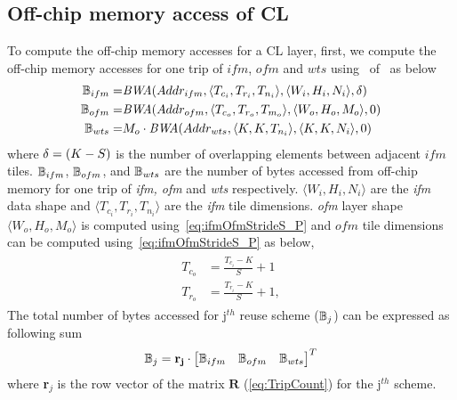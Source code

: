 \subsection{Off-chip memory access of CL}\label{sec:AccessCLData}
To compute the off-chip memory accesses for a CL layer, first, we compute the off-chip memory accesses for one trip of $ifm$, $ofm$ and $wts$ using~ of~ as below
\begin{align}\label{eq:MemAccessCL}
	\begin{split}
		\mathbb{B}_{ifm}=&\emph{BWA}(Addr_{ifm},\langle T_{c_i}, T_{r_i},T_{n_i}\rangle,\langle W_i,H_i,N_i\rangle,\delta)\\
		\mathbb{B}_{ofm}=&\emph{BWA}(Addr_{ofm},\langle T_{c_o},T_{r_o},T_{m_o}\rangle,\langle W_o,H_o,M_o\rangle,0)\\
		\mathbb{B}_{wts}=&M_o\cdot \emph{BWA}(Addr_{wts},\langle K,K,T_{n_i}\rangle,\langle K,K,N_i\rangle,0)
	\end{split}
\end{align} 
where $\delta=(K-S)$ is the number of overlapping elements between adjacent $ifm$ tiles. $\mathbb{B}_{ifm}$, $\mathbb{B}_{ofm}$, and $\mathbb{B}_{wts}$ are the number of bytes accessed from off-chip memory for one trip of \textit{ifm, ofm} and \textit{wts} respectively. $\langle W_{i},H_{i},N_{i}\rangle$ are the \textit{ifm} data shape and $\langle T_{c_i},T_{r_i},T_{n_i}\rangle$ are the \textit{ifm} tile dimensions. \textit{ofm} layer shape $\langle W_{o},H_{o},M_{o}\rangle$ is computed using~\eqref{eq:ifmOfmStrideS_P} and $ofm$ tile dimensions can be computed using~\eqref{eq:ifmOfmStrideS_P} as below,
\begin{align}\label{eq:ofmAndifmTileDims}
	\begin{split}
		T_{c_o}&=\frac{T_{c_{i}}-K}{S}+1 \\
		T_{r_o}&=\frac{T_{r_{i}}-K}{S}+1,
	\end{split}
\end{align}  
The total number of bytes accessed for j$^{th}$ reuse scheme ($\mathbb{B}_j$) can be expressed as following sum
\begin{equation} \label{eq:TotalOffChipAccess}
	\mathbb{B}_j=\mathbf{r_j}\cdot \begin{bmatrix}
		\mathbb{B}_{ifm} &
		\mathbb{B}_{ofm} &
		\mathbb{B}_{wts}
	\end{bmatrix}^{T}
\end{equation}
where \textbf{r}$_j$ is the row vector of the matrix $\mathbf{R}$ (\eqref{eq:TripCount}) for the j$^{th}$ scheme. 
